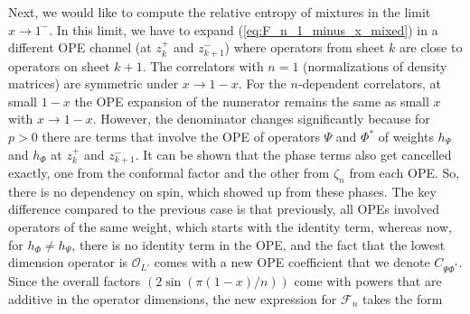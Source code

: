 \documentclass[11pt]{article}
\newcommand{\mO}{\mathcal{O}}
\newcommand{\nn}{\nonumber}
\newcommand{\lb}{\left(}
\newcommand{\rb}{\right)}
\begin{document}
Next, we would like to compute the relative entropy of mixtures in the limit $x\to 1^-$. In this limit, we have to expand (\ref{eq:F_n_1_minus_x_mixed}) in a different OPE channel (at $z_k^+$ and $z_{k+1}^-$) where operators from sheet $k$ are close to operators on sheet $k+1$. The correlators with $n=1$ (normalizations of density matrices) are symmetric under $x\to 1-x$. For the $n$-dependent correlators, at small $1-x$ the OPE expansion of the numerator remains the same as small $x$ with $x\to 1-x$. However, the denominator changes significantly because for $p>0$ there are terms that involve the OPE of operators $\Psi$ and $\Phi^*$ of weights $h_\Psi$ and $h_{\Phi}$ at $z_k^+$ and $z_{k+1}^-$. It can be shown that the phase terms also get cancelled exactly, one from the conformal factor and the other from $\zeta_n$ from each OPE. So, there is no dependency on spin, which showed up from these phases. 
  The key difference compared to the previous case is that previously, all OPEs involved operators of the same weight, which starts with the identity term, whereas now, for $h_\Phi\neq h_\Psi$, there is no identity term in the OPE, and the fact that the lowest dimension operator is $\mO_{L'}$ comes with a new OPE coefficient that we denote $C_{\Psi\Phi^*}$. Since the overall factors $(2\sin(\pi (1-x)/n))$ come with powers that are additive in the operator dimensions, the new expression for $\mathcal{F}_n$  takes the form
\end{document}
